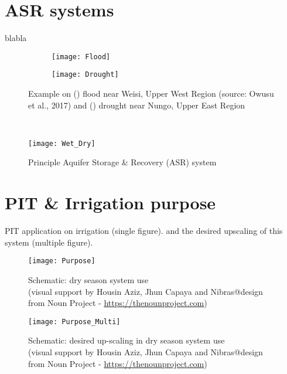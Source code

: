 \section{ASR systems}
blabla
\begin{figure}[h!]
	\centering
	\begin{subfigure}[b]{0.5\linewidth}
		\centering\texttt{[image: Flood]}
		\captionsetup{justification=centering}		
		\caption{\label{fig:Flood}}
		\end{subfigure}%
	\begin{subfigure}[b]{0.5\linewidth}
        \centering\texttt{[image: Drought]}
		\captionsetup{justification=centering}		
		\caption{\label{fig:Drought}}
		\end{subfigure}
		\captionsetup{justification=centering}	
	\caption[Example on () flood near Weisi, Upper West Region and () drought near Nungo, Upper East Region]{Example on () flood near Weisi, Upper West Region (source: Owusu et al., 2017) and () drought near Nungo, Upper East Region} 
	\label{fig:Flood_Drought}
\end{figure} \\

\begin{figure}[h]
 \centering\texttt{[image: Wet\_Dry]}
 \captionsetup{justification=centering}
 \caption{Principle Aquifer Storage \& Recovery (ASR) system}
 \label{fig:ASR}
\end{figure}

\section{PIT \& Irrigation purpose}
PIT application on irrigation (single figure). and the desired upscaling of this system (multiple figure). 

\begin{figure}[h]
 \centering\texttt{[image: Purpose]}
 \captionsetup{justification=centering}
 \caption[Schematic: dry season system use]{Schematic: dry season system use \\ (visual support by Housin Aziz, Jhun Capaya and Nibras@design from Noun Project - \url{https://thenounproject.com})}
 \label{fig:Purpose}
\end{figure}

\begin{figure}[h]
 \centering\texttt{[image: Purpose\_Multi]}
 \captionsetup{justification=centering}
 \caption[Schematic: desired up-scaling in dry season system use]{Schematic: desired up-scaling in dry season system use \\ (visual support by Housin Aziz, Jhun Capaya and Nibras@design from Noun Project - \url{https://thenounproject.com})}
 \label{fig:Purpose_Multi}
\end{figure}

